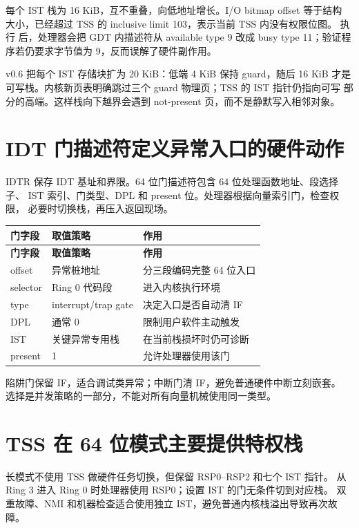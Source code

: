 每个 IST 栈为 16 KiB，互不重叠，向低地址增长。I/O bitmap offset 等于结构
大小，已经超过 TSS 的 inclusive limit 103，表示当前 TSS 内没有权限位图。
执行  后，处理器会把 GDT 内描述符从 available type 9 改成 busy
type 11；验证程序若仍要求字节值为 9，反而误解了硬件副作用。

v0.6 把每个 IST 存储块扩为 20 KiB：低端 4 KiB 保持 guard，随后 16 KiB
才是可写栈。内核新页表明确跳过三个 guard 物理页；TSS 的 IST 指针仍指向可写
部分的高端。这样栈向下越界会遇到 not-present 页，而不是静默写入相邻对象。

\section{IDT 门描述符定义异常入口的硬件动作}

IDTR 保存 IDT 基址和界限。64 位门描述符包含 64 位处理函数地址、段选择子、
IST 索引、门类型、DPL 和 present 位。处理器根据向量索引门，检查权限，
必要时切换栈，再压入返回现场。

\begin{longtable}{L{0.19\textwidth}L{0.24\textwidth}L{0.43\textwidth}}
\toprule
\textbf{门字段} & \textbf{取值策略} & \textbf{作用}\\
\midrule
\endfirsthead
\toprule
\textbf{门字段} & \textbf{取值策略} & \textbf{作用}\\
\midrule
\endhead
offset & 异常桩地址 & 分三段编码完整 64 位入口\\
selector & Ring 0 代码段 & 进入内核执行环境\\
type & interrupt/trap gate & 决定入口是否自动清 IF\\
DPL & 通常 0 & 限制用户软件主动触发\\
IST & 关键异常专用栈 & 在当前栈损坏时仍可诊断\\
present & 1 & 允许处理器使用该门\\
\bottomrule
\end{longtable}

陷阱门保留 IF，适合调试类异常；中断门清 IF，避免普通硬件中断立刻嵌套。
选择是并发策略的一部分，不能对所有向量机械使用同一类型。

\section{TSS 在 64 位模式主要提供特权栈}

长模式不使用 TSS 做硬件任务切换，但保留 RSP0--RSP2 和七个 IST 指针。
从 Ring 3 进入 Ring 0 时处理器使用 RSP0；设置 IST 的门无条件切到对应栈。
双重故障、NMI 和机器检查适合使用独立 IST，避免普通内核栈溢出导致再次故障。


